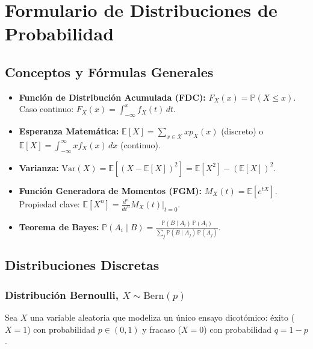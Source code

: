 \chapter{Formulario de Distribuciones de Probabilidad}
\section{Conceptos y Fórmulas Generales}
\vspace{0.5em}
\begin{itemize}\setlength\itemsep{0.5em}
    \item \textbf{Función de Distribución Acumulada (FDC):} $F_X(x) = \mathbb{P}(X \le x)$. \\ Caso continuo: $F_X(x) = \int_{-\infty}^{x} f_X(t) \, dt$.
    \item \textbf{Esperanza Matemática:} $\displaystyle \mathbb{E}[X] = \sum_{x \in \mathcal{X}} x p_X(x)$ (discreto) o $\displaystyle \mathbb{E}[X] = \int_{-\infty}^{\infty} x f_X(x) \, dx$ (continuo).
    \item \textbf{Varianza:} $\text{Var}(X) = \mathbb{E}[(X - \mathbb{E}[X])^2] = \mathbb{E}[X^2] - (\mathbb{E}[X])^2$.
    \item \textbf{Función Generadora de Momentos (FGM):} $M_X(t) = \mathbb{E}[e^{tX}]$. Propiedad clave: $\mathbb{E}[X^n] = \frac{d^n}{dt^n}M_X(t)\Big|_{t=0}$.
    \item \textbf{Teorema de Bayes:} $\displaystyle \mathbb{P}(A_i\mid B) = \frac{\mathbb{P}(B \mid A_i)\, \mathbb{P}(A_i)}{\sum_j \mathbb{P}(B \mid A_j)\, \mathbb{P}(A_j)}$.
\end{itemize}
\newpage
\section{Distribuciones Discretas}
\subsection*{Distribución Bernoulli, $X \sim \text{Bern}(p)$}
Sea $X$ una variable aleatoria que modeliza un único ensayo dicotómico: éxito ($X=1$) con probabilidad $p \in (0,1)$ y fracaso ($X=0$) con probabilidad $q = 1-p$.


